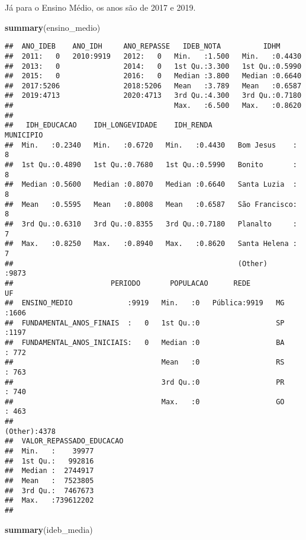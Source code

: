 \documentclass[
]{article}
\newenvironment{Shaded}{\begin{snugshade}}{\end{snugshade}}
\newcommand{\KeywordTok}[1]{\textcolor[rgb]{0.13,0.29,0.53}{\textbf{#1}}}
\newcommand{\NormalTok}[1]{#1}
\begin{document}
Já para o Ensino Médio, os anos são de 2017 e 2019.

\begin{Shaded}
\begin{Highlighting}[]
\KeywordTok{summary}\NormalTok{(ensino\_medio)}
\end{Highlighting}
\end{Shaded}

\begin{verbatim}
##  ANO_IDEB    ANO_IDH     ANO_REPASSE   IDEB_NOTA          IDHM       
##  2011:   0   2010:9919   2012:   0   Min.   :1.500   Min.   :0.4430  
##  2013:   0               2014:   0   1st Qu.:3.300   1st Qu.:0.5990  
##  2015:   0               2016:   0   Median :3.800   Median :0.6640  
##  2017:5206               2018:5206   Mean   :3.789   Mean   :0.6587  
##  2019:4713               2020:4713   3rd Qu.:4.300   3rd Qu.:0.7180  
##                                      Max.   :6.500   Max.   :0.8620  
##                                                                      
##   IDH_EDUCACAO    IDH_LONGEVIDADE    IDH_RENDA              MUNICIPIO   
##  Min.   :0.2340   Min.   :0.6720   Min.   :0.4430   Bom Jesus    :   8  
##  1st Qu.:0.4890   1st Qu.:0.7680   1st Qu.:0.5990   Bonito       :   8  
##  Median :0.5600   Median :0.8070   Median :0.6640   Santa Luzia  :   8  
##  Mean   :0.5595   Mean   :0.8008   Mean   :0.6587   São Francisco:   8  
##  3rd Qu.:0.6310   3rd Qu.:0.8355   3rd Qu.:0.7180   Planalto     :   7  
##  Max.   :0.8250   Max.   :0.8940   Max.   :0.8620   Santa Helena :   7  
##                                                     (Other)      :9873  
##                       PERIODO       POPULACAO      REDE            UF      
##  ENSINO_MEDIO             :9919   Min.   :0   Pública:9919   MG     :1606  
##  FUNDAMENTAL_ANOS_FINAIS  :   0   1st Qu.:0                  SP     :1197  
##  FUNDAMENTAL_ANOS_INICIAIS:   0   Median :0                  BA     : 772  
##                                   Mean   :0                  RS     : 763  
##                                   3rd Qu.:0                  PR     : 740  
##                                   Max.   :0                  GO     : 463  
##                                                              (Other):4378  
##  VALOR_REPASSADO_EDUCACAO
##  Min.   :    39977       
##  1st Qu.:   992816       
##  Median :  2744917       
##  Mean   :  7523805       
##  3rd Qu.:  7467673       
##  Max.   :739612202       
## 
\end{verbatim}

\begin{Shaded}
\begin{Highlighting}[]
\KeywordTok{summary}\NormalTok{(ideb\_media)}
\end{Highlighting}
\end{Shaded}
\end{document}
